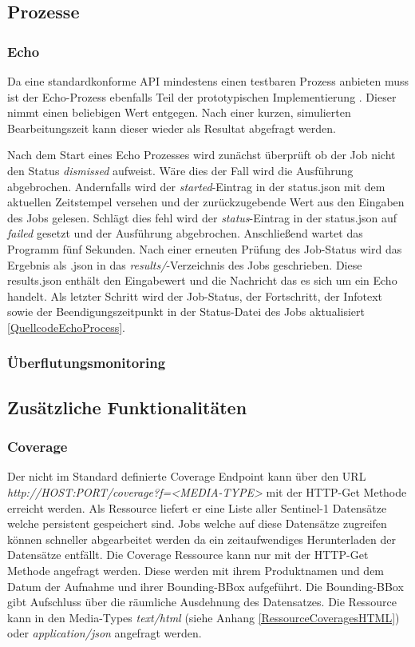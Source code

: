 \subsection{Prozesse}
\subsubsection{Echo}
Da eine standardkonforme API mindestens einen testbaren Prozess anbieten muss ist der Echo-Prozess ebenfalls Teil der prototypischen Implementierung \cite{ogc_api_processes_core}. 
Dieser nimmt einen beliebigen Wert entgegen. Nach einer kurzen, simulierten Bearbeitungszeit kann dieser wieder als Resultat abgefragt werden. 

Nach dem Start eines Echo Prozesses wird zunächst überprüft ob der Job nicht den Status \textit{dismissed} aufweist. Wäre dies der Fall wird die Ausführung abgebrochen. 
Andernfalls wird der \textit{started}-Eintrag in der status.json mit dem aktuellen Zeitstempel versehen und der zurückzugebende Wert aus den Eingaben des Jobs gelesen.
Schlägt dies fehl wird der \textit{status}-Eintrag in der status.json auf \textit{failed} gesetzt und der Ausführung abgebrochen. 
Anschließend wartet das Programm fünf Sekunden. Nach einer erneuten Prüfung des Job-Status wird das Ergebnis als .json in das \textit{results/}-Verzeichnis des Jobs geschrieben.
Diese results.json enthält den Eingabewert und die Nachricht das es sich um ein Echo handelt. 
Als letzter Schritt wird der Job-Status, der Fortschritt, der Infotext sowie der Beendigungszeitpunkt in der Status-Datei des Jobs aktualisiert \ref{QuellcodeEchoProcess}.

\subsubsection{Überflutungsmonitoring}
\subsection{Zusätzliche Funktionalitäten}
\subsubsection{Coverage} 
Der nicht im Standard definierte Coverage Endpoint kann über den URL \textit{http://HOST:PORT/coverage?f=<MEDIA-TYPE>} mit der HTTP-Get Methode erreicht werden. 
Als Ressource liefert er eine Liste aller Sentinel-1 Datensätze welche persistent gespeichert sind. 
Jobs welche auf diese Datensätze zugreifen können schneller abgearbeitet werden da ein zeitaufwendiges Herunterladen der Datensätze entfällt. 
Die Coverage Ressource kann nur mit der HTTP-Get Methode angefragt werden. 
Diese werden mit ihrem Produktnamen und dem Datum der Aufnahme 
und ihrer Bounding-BBox aufgeführt. Die Bounding-BBox gibt Aufschluss über die räumliche Ausdehnung des Datensatzes. 
Die Ressource kann in den Media-Types \textit{text/html} (siehe Anhang \ref{RessourceCoveragesHTML}) oder \textit{application/json} angefragt werden. 

